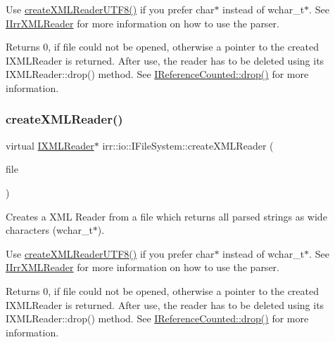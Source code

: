 Use \hyperlink{classirr_1_1io_1_1IFileSystem_affd8f622ac7c3dcd507f20f9cd23b21f}{create\+X\+M\+L\+Reader\+U\+T\+F8()} if you prefer char$\ast$ instead of wchar\+\_\+t$\ast$. See \hyperlink{classirr_1_1io_1_1IIrrXMLReader}{I\+Irr\+X\+M\+L\+Reader} for more information on how to use the parser. \begin{DoxyReturn}{Returns}
0, if file could not be opened, otherwise a pointer to the created I\+X\+M\+L\+Reader is returned. After use, the reader has to be deleted using its I\+X\+M\+L\+Reader\+::drop() method. See \hyperlink{classirr_1_1IReferenceCounted_a03856a09355b89d178090c4a5f738543}{I\+Reference\+Counted\+::drop()} for more information. 
\end{DoxyReturn}
\mbox{\label{classirr_1_1io_1_1IFileSystem_a38f4c90db3fd1b21473ce0cd2437bb59}} 
\subsubsection{\texorpdfstring{create\+X\+M\+L\+Reader()}{createXMLReader()}\hspace{0.1cm}{\footnotesize\ttfamily [4/4]}}
{\footnotesize\ttfamily virtual \hyperlink{namespaceirr_1_1io_ab620b13630f0818f3eefc000f6917fe4}{I\+X\+M\+L\+Reader}$\ast$ irr\+::io\+::\+I\+File\+System\+::create\+X\+M\+L\+Reader (\begin{DoxyParamCaption}\item[{\hyperlink{classirr_1_1io_1_1IReadFile}{I\+Read\+File} $\ast$}]{file }\end{DoxyParamCaption})\hspace{0.3cm}{\ttfamily [pure virtual]}}



Creates a X\+ML Reader from a file which returns all parsed strings as wide characters (wchar\+\_\+t$\ast$). 

Use \hyperlink{classirr_1_1io_1_1IFileSystem_affd8f622ac7c3dcd507f20f9cd23b21f}{create\+X\+M\+L\+Reader\+U\+T\+F8()} if you prefer char$\ast$ instead of wchar\+\_\+t$\ast$. See \hyperlink{classirr_1_1io_1_1IIrrXMLReader}{I\+Irr\+X\+M\+L\+Reader} for more information on how to use the parser. \begin{DoxyReturn}{Returns}
0, if file could not be opened, otherwise a pointer to the created I\+X\+M\+L\+Reader is returned. After use, the reader has to be deleted using its I\+X\+M\+L\+Reader\+::drop() method. See \hyperlink{classirr_1_1IReferenceCounted_a03856a09355b89d178090c4a5f738543}{I\+Reference\+Counted\+::drop()} for more information. 
\end{DoxyReturn}
\mbox{\label{classirr_1_1io_1_1IFileSystem_affd8f622ac7c3dcd507f20f9cd23b21f}} 
